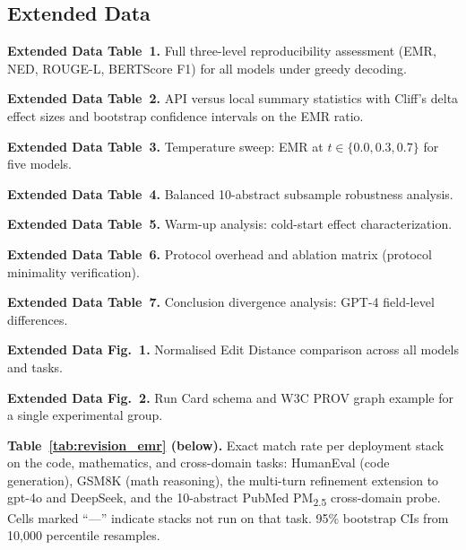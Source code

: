 \documentclass[sn-nature]{sn-jnl}
\begin{document}

\begin{appendices}

\section{Extended Data}\label{sec:extdata}

\noindent\textbf{Extended Data Table~1.}
Full three-level reproducibility assessment (EMR, NED, ROUGE-L, BERTScore F1)
for all models under greedy decoding.

\medskip\noindent\textbf{Extended Data Table~2.}
API versus local summary statistics with Cliff's delta effect sizes
and bootstrap confidence intervals on the EMR ratio.

\medskip\noindent\textbf{Extended Data Table~3.}
Temperature sweep: EMR at $t \in \{0.0, 0.3, 0.7\}$ for five models.

\medskip\noindent\textbf{Extended Data Table~4.}
Balanced 10-abstract subsample robustness analysis.

\medskip\noindent\textbf{Extended Data Table~5.}
Warm-up analysis: cold-start effect characterization.

\medskip\noindent\textbf{Extended Data Table~6.}
Protocol overhead and ablation matrix (protocol minimality verification).

\medskip\noindent\textbf{Extended Data Table~7.}
Conclusion divergence analysis: GPT-4 field-level differences.

\medskip\noindent\textbf{Extended Data Fig.~1.}
Normalised Edit Distance comparison across all models and tasks.

\medskip\noindent\textbf{Extended Data Fig.~2.}
Run Card schema and W3C PROV graph example for a single experimental group.

\medskip\noindent\textbf{Table~\ref{tab:revision_emr} (below).}
Exact match rate per deployment stack on the code, mathematics, and cross-domain tasks: HumanEval (code generation), GSM8K (math reasoning), the multi-turn refinement extension to gpt-4o and DeepSeek, and the 10-abstract PubMed PM\textsubscript{2.5} cross-domain probe. Cells marked ``---'' indicate stacks not run on that task. 95\% bootstrap CIs from 10{,}000 percentile resamples.


\end{appendices}
\end{document}
